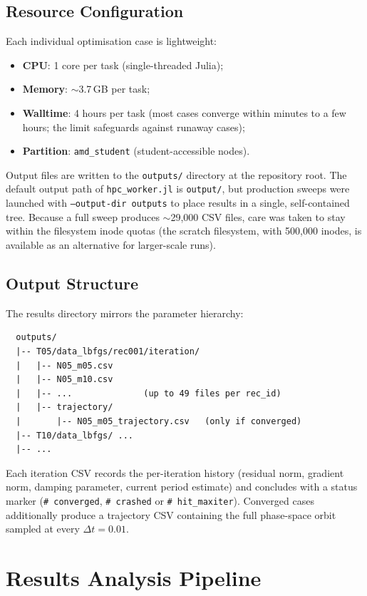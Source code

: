 \documentclass[11pt,a4paper]{article}
\begin{document}
\subsection{Resource Configuration}
Each individual optimisation case is lightweight:
\begin{itemize}
  \item \textbf{CPU}: 1 core per task (single-threaded Julia);
  \item \textbf{Memory}: $\sim$3.7\,GB per task;
  \item \textbf{Walltime}: 4 hours per task (most cases converge within
        minutes to a few hours; the limit safeguards against runaway cases);
  \item \textbf{Partition}: \texttt{amd\_student} (student-accessible nodes).
\end{itemize}
Output files are written to the \texttt{outputs/} directory at the
repository root.  The default output path of \texttt{hpc\_worker.jl} is
\texttt{output/}, but production sweeps were launched with
\texttt{--output-dir outputs} to place results in a single, self-contained
tree.  Because a full sweep produces $\sim$29,000 CSV files, care was taken
to stay within the filesystem inode quotas (the scratch filesystem, with
500,000 inodes, is available as an alternative for larger-scale runs).

\subsection{Output Structure}
The results directory mirrors the parameter hierarchy:
\begin{verbatim}
  outputs/
  |-- T05/data_lbfgs/rec001/iteration/
  |   |-- N05_m05.csv
  |   |-- N05_m10.csv
  |   |-- ...              (up to 49 files per rec_id)
  |   |-- trajectory/
  |       |-- N05_m05_trajectory.csv   (only if converged)
  |-- T10/data_lbfgs/ ...
  |-- ...
\end{verbatim}
Each iteration CSV records the per-iteration history (residual norm, gradient
norm, damping parameter, current period estimate) and concludes with a status
marker (\texttt{\# converged}, \texttt{\# crashed} or \texttt{\# hit\_maxiter}).  
Converged cases additionally produce a trajectory CSV
containing the full phase-space orbit sampled at every $\Delta t = 0.01$.

\section{Results Analysis Pipeline}
\end{document}
